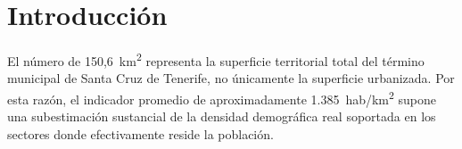 \section{Introducción}


El número de 150,6~km\textsuperscript{2} representa la superficie territorial total del término municipal de Santa Cruz de Tenerife, no únicamente la superficie urbanizada. Por esta razón, el indicador promedio de aproximadamente 1.385~hab/km\textsuperscript{2} supone una subestimación sustancial de la densidad demográfica real soportada en los sectores donde efectivamente reside la población.

